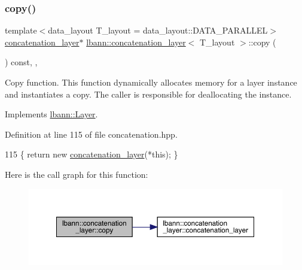 \subsubsection{\texorpdfstring{copy()}{copy()}}
{\footnotesize\ttfamily template$<$data\+\_\+layout T\+\_\+layout = data\+\_\+layout\+::\+D\+A\+T\+A\+\_\+\+P\+A\+R\+A\+L\+L\+EL$>$ \\
\hyperlink{classlbann_1_1concatenation__layer}{concatenation\+\_\+layer}$\ast$ \hyperlink{classlbann_1_1concatenation__layer}{lbann\+::concatenation\+\_\+layer}$<$ T\+\_\+layout $>$\+::copy (\begin{DoxyParamCaption}{ }\end{DoxyParamCaption}) const\hspace{0.3cm}{\ttfamily [inline]}, {\ttfamily [override]}, {\ttfamily [virtual]}}

Copy function. This function dynamically allocates memory for a layer instance and instantiates a copy. The caller is responsible for deallocating the instance. 

Implements \hyperlink{classlbann_1_1Layer_af420f22bbac801c85483ade84588a23f}{lbann\+::\+Layer}.



Definition at line 115 of file concatenation.\+hpp.


\begin{DoxyCode}
115 \{ \textcolor{keywordflow}{return} \textcolor{keyword}{new} \hyperlink{classlbann_1_1concatenation__layer_ab826328d5224933dfc90e246d16de50e}{concatenation\_layer}(*\textcolor{keyword}{this}); \}
\end{DoxyCode}
Here is the call graph for this function\+:\nopagebreak
\begin{figure}[H]
\begin{center}
\leavevmode
\includegraphics[width=350pt]{classlbann_1_1concatenation__layer_a8cdb0b6f5dee578477a3125f5da74573_cgraph}
\end{center}
\end{figure}
\mbox{\label{classlbann_1_1concatenation__layer_a27938ca2422fd120cfbdf823705af01a}} 
